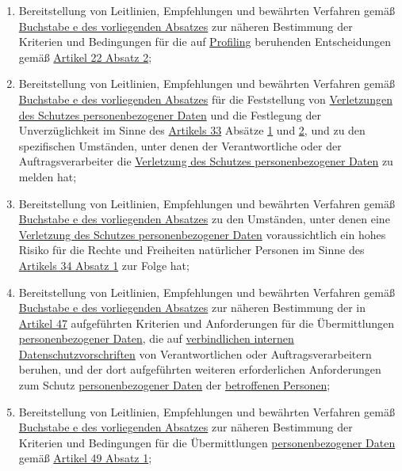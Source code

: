 \begin{enumerate}
\begin{enumerate}
    \item Bereitstellung von Leitlinien, Empfehlungen und bewährten Verfahren gemäß \hyperref[itm:70-1e]{Buchstabe e des
     vorliegenden Absatzes} zur näheren Bestimmung der Kriterien und Bedingungen für die auf \hyperref[itm:04-4]{Profiling} beruhenden
     Entscheidungen gemäß \hyperref[itm:22-2]{Artikel 22 Absatz 2};
    \label{itm:70-1f}

    \item Bereitstellung von Leitlinien, Empfehlungen und bewährten Verfahren gemäß \hyperref[itm:70-1e]{Buchstabe e des
     vorliegenden Absatzes} für die Feststellung von \hyperref[itm:04-12]{Verletzungen des Schutzes personenbezogener Daten} und die
     Festlegung der Unverzüglichkeit im Sinne des \hyperref[ch:33]{Artikels 33} Absätze \hyperref[itm:33-1]{1} und
     \hyperref[itm:33-2]{2}, und zu den spezifischen Umständen, unter denen der Verantwortliche oder der
     Auftragsverarbeiter die \hyperref[itm:04-12]{Verletzung des Schutzes personenbezogener Daten} zu melden hat;
    \label{itm:70-1g}

    \item Bereitstellung von Leitlinien, Empfehlungen und bewährten Verfahren gemäß \hyperref[itm:70-1e]{Buchstabe e des
     vorliegenden Absatzes} zu den Umständen, unter denen eine \hyperref[itm:04-12]{Verletzung des Schutzes personenbezogener Daten}
     voraussichtlich ein hohes Risiko für die Rechte und Freiheiten natürlicher Personen im Sinne des \hyperref
     [itm:34-1]{Artikels 34 Absatz 1} zur Folge hat;
    \label{itm:70-1h}

    \item Bereitstellung von Leitlinien, Empfehlungen und bewährten Verfahren gemäß \hyperref[itm:70-1e]{Buchstabe e des
     vorliegenden Absatzes} zur näheren Bestimmung der in \hyperref[ch:47]{Artikel 47} aufgeführten Kriterien und
     Anforderungen für die Übermittlungen \hyperref[itm:04-1]{personenbezogener Daten}, die auf \hyperref[itm:04-20]{verbindlichen internen
     Datenschutzvorschriften} von Verantwortlichen oder Auftragsverarbeitern beruhen, und der dort aufgeführten weiteren
     erforderlichen Anforderungen zum Schutz \hyperref[itm:04-1]{personenbezogener Daten} der \hyperref[itm:04-1]{betroffenen Personen};
    \label{itm:70-1i}

    \item Bereitstellung von Leitlinien, Empfehlungen und bewährten Verfahren gemäß \hyperref[itm:70-1e]{Buchstabe e des
     vorliegenden Absatzes} zur näheren Bestimmung der Kriterien und Bedingungen für die Übermittlungen
     \hyperref[itm:04-1]{personenbezogener Daten} gemäß \hyperref[itm:49-1-1]{Artikel 49 Absatz 1};
    \label{itm:70-1j}


\end{enumerate}
\end{enumerate}
